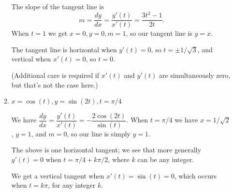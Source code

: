 \documentclass[12pt]{article}
\begin{document}
\begin{enumerate}
\begin{enumerate}
The slope of the tangent line is
\[
m=\frac{dy}{dx}=\frac{y'(t)}{x'(t)} = \frac{3t^2-1}{2t}.
\]
When $t=1$ we get $x=0, y=0, m=1$, so our tangent line is $y=x$.

The tangent line is horizontal when $y'(t)=0$, so $t=\pm 1/\sqrt{3}$, and vertical when $x'(t)=0$, so $t=0$. 

(Additional care is required if $x'(t)$ and $y'(t)$ are simultaneously zero, but that's not the case here.)


\item $x=\cos(t), y=\sin(2t), t=\pi/4$

We have $\dfrac{dy}{dx} = \dfrac{y'(t)}{x'(t)} = -\dfrac{2\cos(2t)}{\sin(t)}$. When $t=\pi/4$ we have $x=1/\sqrt{2}$, $y=1$, and $m=0$, so our line is simply $y=1$.

The above is one horizontal tangent; we see that more generally $y'(t)=0$ when $t=\pi/4+k\pi/2$, where $k$ can be any integer.

We get a vertical tangent when $x'(t)=\sin(t)=0$, which occurs when $t=k\pi$, for any integer $k$.
\end{enumerate}
\end{enumerate}
\end{document}
